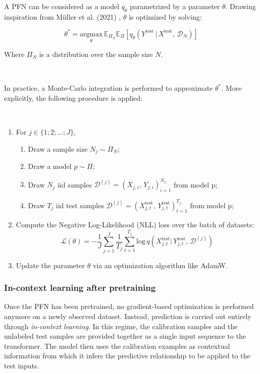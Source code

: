 \documentclass{article}
\begin{document}
A PFN can be considered as a model $q_{\theta}$ parametrized by a parameter $\theta$. Drawing inspiration from Müller et al. (2021) \cite{muller_transformers_2024}, $\theta$ is optimized by solving:

$$\theta^* = \underset{\theta}{\text{argmax}} \, \mathbb{E}_{\Pi_N} \mathbb{E}_{\Pi} [q_{\theta}(Y^{\text{test}}\, |\, X^{\text{test}}, \, \mathcal{D}_N)]$$

Where $\Pi_N$ is a distribution over the sample size $N$.

~

In practice, a Monte-Carlo integration is performed to approximate $\theta^*$. More explicitly, the following procedure is applied:

~

\begin{enumerate}[label=\Alph*]
    \item For $j \in \{1;2;\dots;J \}$,
    
    \begin{enumerate}[label=\roman*]
        \item Draw a sample size $N_j \sim \Pi_N$;
        \item Draw a model $p \sim \Pi$;
        \item Draw $N_j$ iid samples $\mathcal{D}^{(j)} = (X_{j,i},\, Y_{j,i})_{i=1}^{N_j}$ from model p;
        \item Draw $T_j$ iid test samples $\mathcal{D}^{(j)} = (X_{j,t}^{\text{test}},\, Y_{j,t}^{\text{test}})_{t=1}^{T_j}$ from model p;
    \end{enumerate}

    \item Compute the Negative Log-Likelihood (NLL) loss over the batch of datasets: $$\mathcal{L}(\theta) = - \frac{1}{J} \sum_{j=1}^J \frac{1}{T_j} \sum_{t=1}^{T_j} \text{log} \, q(X_{j,t}^{\text{test}}|\, Y_{j,t}^{\text{test}},\, \mathcal{D}^{(j)})$$
    
    \item Update the parameter $\theta$ via an optimization algorithm like AdamW.
\end{enumerate}



\subsubsection{In-context learning after pretraining}

Once the PFN has been pretrained, no gradient-based optimization is performed anymore on a newly observed dataset. Instead, prediction is carried out entirely through \emph{in-context learning}. In this regime, the calibration samples and the unlabeled test samples are provided together as a single input sequence to the transformer. The model then uses the calibration examples as contextual information from which it infers the predictive relationship to be applied to the test inputs.
\end{document}
